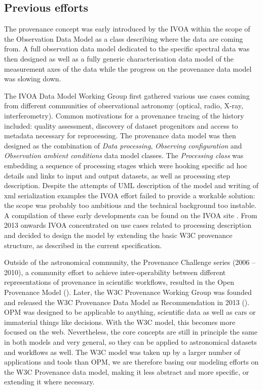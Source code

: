 \subsection{Previous efforts}
The provenance concept was early introduced by the IVOA within the scope of the Observation Data Model \citep[see IVOA note][]{note:observationdm} as a class describing where the data are coming from. A full observation data model dedicated to the specific spectral data was then designed \citep[Spectral Data Model,][]{std:SpectralDM} as well as a fully generic characterisation data model of the measurement axes of the data \citep[Characterisation Data Model][]{std:CharacterisationDM} while the progress on the provenance data model was slowing down.

The IVOA Data Model Working Group first gathered various use cases coming from different communities of observational astronomy (optical, radio, X-ray, interferometry). Common motivations for a provenance tracing of the history included: quality assessment, discovery of dataset progenitors and access to metadata necessary for reprocessing. The provenance data model was then designed as the combination of \emph{Data processing}, \emph{Observing configuration} and \emph{Observation ambient conditions} data model classes. 
The \emph{Processing class} was embedding a sequence of processing stages which were hooking specific ad hoc details and links to input and output datasets, as well as processing step description. 
Despite the attempts of UML description of the model and writing of xml serialization examples the IVOA effort failed to provide a workable solution: the scope was probably too ambitious and the technical background too instable. A compilation of these early developments can be found on the IVOA site \citep{std:previousefforts}. From 2013 onwards IVOA concentrated on use cases related to processing description and decided to design the model by extending the basic W3C provenance structure, as described in the current specification. 

Outside of the astronomical community, the Provenance Challenge series (2006 -- 2010), a community effort to achieve inter-operability between different representations of provenance in scientific workflows, resulted in the Open Provenance Model (\cite{moreau2010}). 
Later, the W3C Provenance Working Group was founded and released the W3C Provenance Data Model as Recommendation in 2013 (\cite{std:W3CProvDM}). 
OPM was designed to be applicable to anything, scientific data as well as cars or immaterial things like decisions. With the W3C model, this becomes more focused on the web. Nevertheless, the core concepts are still in principle the same in both models and very general, so they can be applied to astronomical datasets and workflows as well. 
The W3C model was taken up by a larger number of applications and tools than OPM, we are therefore basing our modeling efforts on the W3C Provenance data model, making it less abstract and more specific, or extending it where necessary. 


